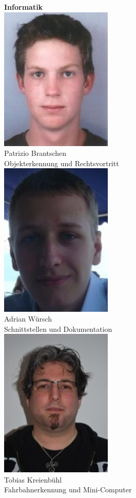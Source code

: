 \begin{minipage}{0.45\textwidth}
\begin{flushright} \large
\textbf{Informatik}\\[2ex]
\includegraphics[width=0.4\textwidth]{./04_Projektmanagement/fig/patriziobrantschen.jpg}\\
Patrizio Brantschen\\
Objekterkennung und Rechtsvortritt\\[2ex]
\includegraphics[width=0.4\textwidth]{./04_Projektmanagement/fig/adrianwuersch.jpg}\\
Adrian Würsch\\
Schnittstellen und Dokumentation\\[2ex]
\includegraphics[width=0.4\textwidth]{./04_Projektmanagement/fig/tobiaskreienbuehl.jpg}\\
Tobias Kreienbühl\\
Fahrbahnerkennung und Mini-Computer\\[2ex]
\end{flushright}
\end{minipage}










